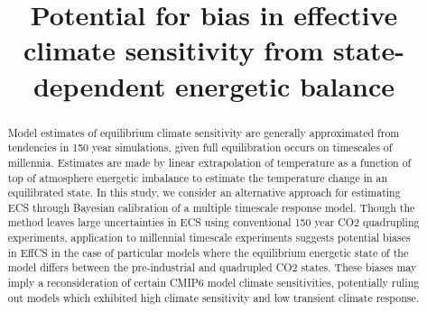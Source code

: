 \documentclass[esd, article]{copernicus}
\begin{document}
\title{Potential for bias in effective climate sensitivity from state-dependent energetic balance}















\received{}
\pubdiscuss{} %
\revised{}
\accepted{}
\published{}




\maketitle



\begin{abstract}
Model estimates of equilibrium climate sensitivity are generally approximated from tendencies in 150  year simulations, given full equilibration occurs on timescales of millennia.  Estimates are made by linear extrapolation of temperature as a function of top of atmosphere energetic imbalance to estimate the temperature change in an equilibrated state.  In this study, we consider an alternative approach for estimating ECS through Bayesian calibration of a multiple timescale response model.  Though the method leaves large uncertainties in ECS using conventional 150 year CO2 quadrupling experiments, application to millennial timescale experiments suggests potential biases in EffCS in the case of particular models where the equilibrium energetic state of the model differs between the pre-industrial and quadrupled CO2 states.  These biases may imply a reconsideration of certain CMIP6 model climate sensitivities, potentially ruling out models which exhibited high climate sensitivity and low transient climate response. 
\end{abstract}
\end{document}
